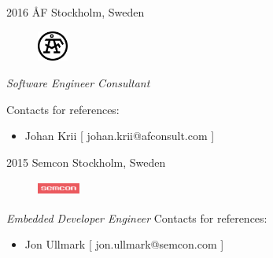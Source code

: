 \documentclass[]{friggeri-cv} %
\begin{document}
\begin{entrylist}
\entry
{2016}
{ÅF}
{Stockholm, Sweden}
{
	\begin{figure}
		\vspace{-20pt}
		\begin{center}
			\includegraphics[width=1cm,height=1cm]{af}
		\end{center}
	\end{figure}
	\emph{Software Engineer Consultant}

	Contacts for references:
	\begin{itemize}
		\item Johan Krii [ johan.krii@afconsult.com ]
	\end{itemize}
}
\end{entrylist}


\begin{entrylist}
\entry
{2015}
{Semcon}
{Stockholm, Sweden}
{
	\begin{figure}
		\vspace{-20pt}
		\begin{center}
			\includegraphics[width=1.4cm,height=0.5cm]{semcon}
		\end{center}
	\end{figure}
	\emph{Embedded Developer Engineer}
	Contacts for references:
	\begin{itemize}
		\item Jon Ullmark [ jon.ullmark@semcon.com ]
	\end{itemize}
}
\end{entrylist}
\end{document}
